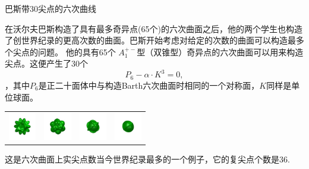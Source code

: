 ﻿\begin{surferPage}[六次曲线(30 尖点)]{巴斯带30尖点的六次曲线}

在沃尔夫巴斯构造了具有最多奇异点(65个)的六次曲面之后，他的两个学生也构造了创世界纪录的更高次数的曲面。巴斯开始考虑对给定的次数的曲面可以构造最多个尖点的问题。
他的具有65个 $A_1^{+-}$型（双锥型）奇异点的六次曲面可以用来构造尖点。这便产生了30个\[P_6 - \alpha \cdot K^3=0,\]，其中$P_6$是正二十面体中与构造Barth六次曲面时相同的一个对称面，$K$同样是单位球面。


    \vspace*{-0.4em}
    \begin{center}
      \begin{tabular}{c@{\ }c@{\ }c@{\ }c}
        \includegraphics[height=1.2cm]{./../../common/images/barthsextic_30A2}
        &
        \includegraphics[height=1.2cm]{./../../common/images/barthsextic_30A2_3}
        &
        \includegraphics[height=1.2cm]{./../../common/images/barthsextic_30A2_5}
        &
        \includegraphics[height=1.2cm]{./../../common/images/barthsextic_30A2_6}
      \end{tabular}
    \end{center}    
    \vspace*{-0.3em}

这是六次曲面上实尖点数当今世界纪录最多的一个例子，它的复尖点个数是36.
\end{surferPage}

